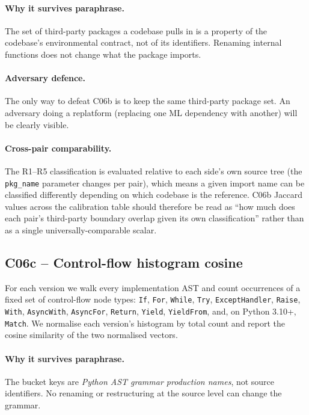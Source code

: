 \documentclass[11pt,letterpaper]{article}
\begin{document}
\paragraph{Why it survives paraphrase.} The set of third-party
packages a codebase pulls in is a property of the codebase's
environmental contract, not of its identifiers. Renaming internal
functions does not change what the package imports.

\paragraph{Adversary defence.} The only way to defeat C06b is to
keep the same third-party package set. An adversary doing a
replatform (replacing one ML dependency with another) will be
clearly visible.

\paragraph{Cross-pair comparability.} The R1--R5 classification is
evaluated relative to each side's own source tree (the
\texttt{pkg\_name} parameter changes per pair), which means a given
import name can be classified differently depending on which
codebase is the reference. C06b Jaccard values across the
calibration table should therefore be read as ``how much does each
pair's third-party boundary overlap given its own classification''
rather than as a single universally-comparable scalar.

\subsection{C06c -- Control-flow histogram cosine}
\label{sec:c06c}
For each version we walk every implementation AST and count
occurrences of a fixed set of control-flow node types:
\texttt{If}, \texttt{For}, \texttt{While}, \texttt{Try},
\texttt{ExceptHandler}, \texttt{Raise}, \texttt{With},
\texttt{AsyncWith}, \texttt{AsyncFor}, \texttt{Return}, \texttt{Yield},
\texttt{YieldFrom}, and, on Python 3.10+, \texttt{Match}. We
normalise each version's histogram by total count and report the
cosine similarity of the two normalised vectors.

\paragraph{Why it survives paraphrase.} The bucket keys are
\emph{Python AST grammar production names}, not source identifiers.
No renaming or restructuring at the source level can change the
grammar.
\end{document}
